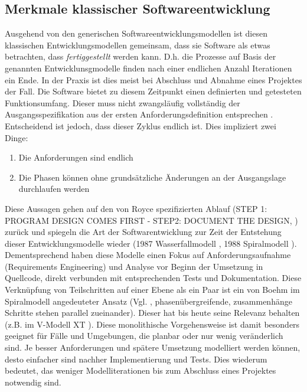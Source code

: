 \subsection{Merkmale klassischer Softwareentwicklung}
\label{Merkmale klassischer Softwareentwicklung}
Ausgehend von den generischen Softwareentwicklungsmodellen ist diesen klassischen Entwicklungsmodellen gemeinsam, dass sie Software als etwas betrachten, dass \textit{fertiggestellt} werden kann. D.h. die Prozesse auf Basis der genannten Entwicklunsgmodelle finden nach einer endlichen Anzahl Iterationen ein Ende. In der Praxis ist dies meist bei Abschluss und Abnahme eines Projektes der Fall. Die Software bietet zu diesem Zeitpunkt einen definierten und getesteten Funktionsumfang. Dieser muss nicht zwangsläufig vollständig der Ausgangsspezifikation aus der ersten Anforderungsdefinition entsprechen \cite[Kap. 9.2]{Manfred_Marko_PM_2013}. Entscheidend ist jedoch, dass dieser Zyklus endlich ist. Dies impliziert zwei Dinge: 
\begin{enumerate}
	\item Die Anforderungen sind endlich
	\item Die Phasen können ohne grundsätzliche Änderungen an der Ausgangslage durchlaufen werden
\end{enumerate}
Diese Aussagen gehen auf den von Royce spezifizierten Ablauf (\glqq{}STEP 1: PROGRAM DESIGN COMES FIRST - STEP2: DOCUMENT THE DESIGN\grqq{}, \cite{royce1987managing}) zurück und spiegeln die Art der Softwarentwicklung zur Zeit der Entstehung dieser Entwicklungsmodelle wieder (1987 Wasserfallmodell \cite{royce1987managing}, 1988 Spiralmodell \cite{boehm_spiral_1988}).
Dementsprechend haben diese Modelle einen Fokus auf Anforderungsaufnahme (\gls{Requirements Engineering}) und Analyse vor Beginn der Umsetzung in Quellcode, direkt verbunden mit entsprechenden Tests und Dokumentation. Diese Verknüpfung von Teilschritten auf einer Ebene als ein Paar ist ein von Boehm im Spiralmodell angedeuteter Ansatz (Vgl. \cite[Abb. 2]{boehm_spiral_1988}, phasenübergreifende, zusammenhänge Schritte stehen parallel zueinander). Dieser hat bis heute seine Relevanz behalten (z.B. im V-Modell XT \cite{noauthor_bundesregierung_nodate}). Diese monolithische Vorgehensweise ist damit besonders geeignet für Fälle und Umgebungen, die planbar oder nur wenig veränderlich sind. Je besser Anforderungen und spätere Umsetzung modelliert werden können, desto einfacher sind nachher Implementierung und Tests. Dies wiederum bedeutet, das weniger Modelliterationen bis zum Abschluss eines Projektes notwendig sind.
